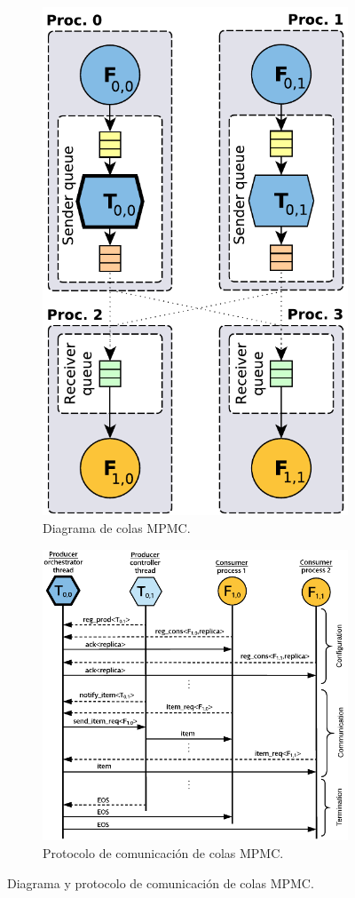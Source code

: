 \begin{itemize}
\vspace{0.35cm}
\begin{figure}[!tbp]
\centering
\begin{subfigure}[b]{0.5\textwidth}
  \centering
  \includegraphics[width=0.55\linewidth]{figures/mpi-mpmc-queue.pdf}
  \caption{Diagrama de colas MPMC.}
  \label{fig:sub1}
\end{subfigure}%
\hfill
\begin{subfigure}[b]{0.5\textwidth}
  \centering
  \includegraphics[width=0.95\linewidth]{figures/mpi-mpmc-communication.pdf}
  \caption{Protocolo de comunicación de colas MPMC.}
  \label{fig:sub2}
\end{subfigure}
\caption{Diagrama y protocolo de comunicación de colas MPMC.}
\label{fig:mpmc-queue}
\end{figure}
\vspace{0.35cm}


\end{itemize}
